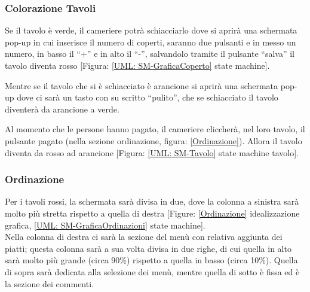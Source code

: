 \documentclass[12pt, letterpaper]{book}
\begin{document}
\subsubsection{Colorazione Tavoli}
Se il tavolo è verde, il cameriere potrà schiacciarlo dove si aprirà una schermata pop-up in cui inserisce il numero di coperti, saranno due pulsanti e in messo un numero, in basso il “+” e in alto il “-”, salvandolo tramite il pulsante “salva” il tavolo diventa rosso [Figura: \ref{UML: SM-GraficaCoperto} state machine].

Mentre se il tavolo che si è schiacciato è arancione si aprirà una schermata pop-up dove ci sarà un tasto con su scritto “pulito”, che se schiacciato il tavolo diventerà da arancione a verde.

Al momento che le persone hanno pagato, il cameriere cliccherà, nel loro tavolo, il pulsante pagato (nella sezione ordinazione, figura: \ref{Ordinazione}). Allora il tavolo diventa da rosso ad arancione [Figura: \ref{UML: SM-Tavolo} state machine tavolo].
\subsubsection{Ordinazione}
Per i tavoli rossi, la schermata sarà divisa in due, dove la colonna a sinistra sarà molto più stretta rispetto a quella di destra [Figure: \ref{Ordinazione} idealizzazione grafica, \ref{UML: SM-GraficaOrdinazioni} state machine].
\medskip
\\Nella colonna di destra ci sarà la sezione del menù con relativa aggiunta dei piatti; questa colonna sarà a sua volta divisa in due righe, di cui quella in alto sarà molto più grande (circa 90\%) rispetto a quella in basso (circa 10\%). Quella di sopra sarà dedicata alla selezione dei menù, mentre quella di sotto è fissa ed è la sezione dei commenti.
\end{document}
